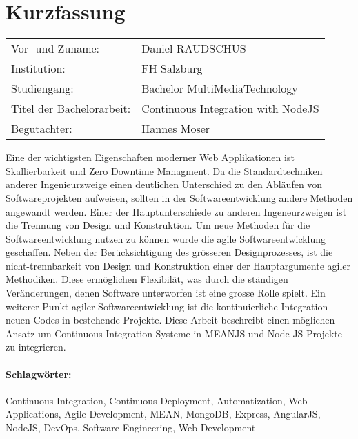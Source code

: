 \section*{Kurzfassung}
\begin{tabular}{l l}
Vor- und Zuname:& Daniel RAUDSCHUS\\
Institution: & FH Salzburg\\
Studiengang: &  Bachelor MultiMediaTechnology\\
Titel der Bachelorarbeit: & Continuous Integration with NodeJS\\
Begutachter: & Hannes Moser\\
\end{tabular}
\vspace{0.5cm}

Eine der wichtigsten Eigenschaften moderner Web Applikationen ist Skallierbarkeit und Zero Downtime Managment. Da die Standardtechniken anderer Ingenieurzweige
einen deutlichen Unterschied zu den Abläufen von Softwareprojekten aufweisen, sollten in der Softwareentwicklung andere Methoden angewandt werden. Einer der
Hauptunterschiede zu anderen Ingeneurzweigen ist die Trennung von Design und Konstruktion. Um neue Methoden für die Softwareentwicklung nutzen zu können
wurde die agile Softwareentwicklung geschaffen. Neben der Berücksichtigung des grösseren Designprozesses, ist die nicht-trennbarkeit von Design und Konstruktion
einer der Hauptargumente agiler Methodiken. Diese ermöglichen Flexibilät, was durch die ständigen Veränderungen, denen Software unterworfen ist eine grosse
Rolle spielt. Ein weiterer Punkt agiler Softwareentwicklung ist die kontinuierliche Integration neuen Codes in bestehende Projekte. Diese Arbeit
beschreibt einen möglichen Ansatz um Continuous Integration Systeme in MEANJS und Node JS Projekte zu integrieren.

\paragraph{Schlagwörter:}
Continuous Integration, Continuous Deployment, Automatization, Web Applications, Agile Development, MEAN, MongoDB, Express, AngularJS, NodeJS, DevOps, Software Engineering, Web Development
